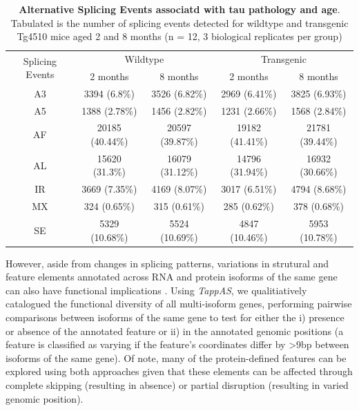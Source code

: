 \vspace{0.5cm}
\begin{table}[!htp]
	\centering
	\captionsetup{width=1\textwidth}
	\caption[Alternative Splicing Events associatd with tau pathology and age]%
	{\textbf{Alternative Splicing Events associatd with tau pathology and age}. Tabulated is the number of splicing events detected for wildtype and transgenic Tg4510 mice aged 2 and 8 months (n = 12, 3 biological replicates per group)}
	\begin{tabular}{@{}ccccc@{}}
		\toprule
		\multirow{2}{*}{Splicing Events} & \multicolumn{2}{c}{Wildtype} & \multicolumn{2}{c}{Transgenic} \\ \cmidrule(l){2-5} 
		& 2 months        & 8 months        & 2 months        & 8 months        \\ \midrule
		A3 & 3394 (6.8\%)    & 3526 (6.82\%)   & 2969 (6.41\%)   & 3825 (6.93\%)   \\
		A5 & 1388 (2.78\%)   & 1456 (2.82\%)   & 1231 (2.66\%)   & 1568 (2.84\%)   \\
		AF & 20185 (40.44\%) & 20597 (39.87\%) & 19182 (41.41\%) & 21781 (39.44\%) \\
		AL & 15620 (31.3\%)  & 16079 (31.12\%) & 14796 (31.94\%) & 16932 (30.66\%) \\
		IR & 3669 (7.35\%)   & 4169 (8.07\%)   & 3017 (6.51\%)   & 4794 (8.68\%)   \\
		MX & 324 (0.65\%)    & 315 (0.61\%)    & 285 (0.62\%)    & 378 (0.68\%)    \\
		SE & 5329 (10.68\%)  & 5524 (10.69\%)  & 4847 (10.46\%)  & 5953 (10.78\%)  \\ \bottomrule
	\end{tabular}
	\label{AS_WholeTranscriptome_diff}
\end{table}

However, aside from changes in splicing patterns, variations in strutural and feature elements annotated across RNA and protein isoforms of the same gene can also have functional implications \cite{DeLaFuente2020}. Using \textit{TappAS}\cite{DeLaFuente2020}, we qualitiatively catalogued the functional diversity of all multi-isoform genes, performing pairwise comparisons between isoforms of the same gene to test for either the i) presence or absence of the annotated feature or ii) in the annotated genomic positions (a feature is classified as varying if the feature's coordinates differ by >9bp between isoforms of the same gene). Of note, many of the protein-defined features can be explored using both approaches given that these elements can be affected through complete skipping (resulting in absence) or partial disruption (resulting in varied genomic position).

